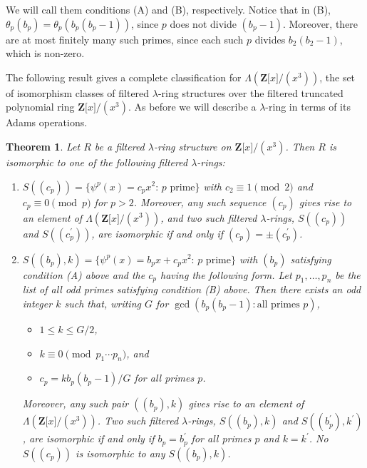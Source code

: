 \documentclass[reqno,11pt]{amsart}
\numberwithin{equation}{subsection}  %
\newtheorem{thm}[subsection]{Theorem}
\newcommand{\bZ}{\mathbf{Z}}
\begin{document}
We will call them conditions (A) and (B), respectively.  Notice that in (B), $\theta_p(b_p) = \theta_p(b_p(b_p - 1))$, since $p$ does not divide $(b_p - 1)$.  Moreover,  there are at most finitely many such primes, since each such $p$ divides $b_2(b_2 - 1)$, which is non-zero.


The following result gives a complete classification for $\Lambda(\bZ \lbrack x \rbrack/(x^3))$, the set of isomorphism classes of filtered $\lambda$-ring structures over the filtered truncated polynomial ring $\bZ \lbrack x \rbrack/(x^3)$.  As before we will describe a $\lambda$-ring in terms of its Adams operations.



\medskip
\begin{thm}
\label{thm:n=3}
Let $R$ be a filtered $\lambda$-ring structure on $\bZ \lbrack x \rbrack/(x^3)$.  Then $R$ is isomorphic to one of the following filtered $\lambda$-rings:
   \begin{enumerate}
   \item $S((c_p)) = \lbrace \psi^p(x) = c_p x^2 \colon \, p \text{ prime} \rbrace$ with $c_2 \equiv 1 \pmod{2}$ and $c_p \equiv 0 \pmod{p}$ for $p > 2$.   Moreover, any such sequence $(c_p)$ gives rise to an element of $\Lambda(\bZ \lbrack x \rbrack/(x^3))$, and two such filtered $\lambda$-rings, $S((c_p))$ and $S((c^\prime_p))$, are isomorphic if and only if $(c_p) = \pm (c^\prime_p)$.
\medskip
   \item  $S((b_p), k) = \lbrace \psi^p(x) = b_px + c_px^2 \colon \,  p \text{ prime} \rbrace$ with $(b_p)$ satisfying condition (A) above and the $c_p$ having the following form.  Let $p_1, \ldots, p_n$ be the list of all odd primes satisfying condition (B) above.  Then there exists an odd integer $k$ such that, writing $G$ for $\gcd(b_p(b_p - 1) \colon \text{all primes } p)$, 
     \begin{itemize}
     \item $1 \leq k \leq G/2$, 
     \item $k \equiv 0 \pmod{p_1\cdots p_n}$, and
     \item $c_p = kb_p(b_p - 1)/G$ for all primes $p$.
     \end{itemize}
Moreover, any such pair $((b_p), k)$ gives rise to an element of $\Lambda(\bZ \lbrack x \rbrack/(x^3))$.  Two such filtered $\lambda$-rings, $S((b_p), k)$ and $S((b_p^\prime), k^\prime)$, are isomorphic if and only if $b_p = b_p^\prime$ for all primes $p$ and $k = k^\prime$.  No $S((c_p))$ is isomorphic to any $S((b_p), k)$.
   \end{enumerate}
\end{thm}
\end{document}

